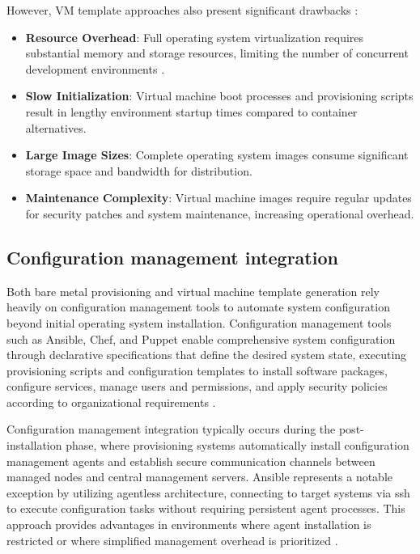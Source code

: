 However, VM template approaches also present significant drawbacks \citep{felterUpdatedPerformanceComparison2015}:
\begin{itemize}
    \item \textbf{Resource Overhead}: Full operating system virtualization requires substantial memory and storage resources, limiting the number of concurrent development environments \citep{kolyasnikovExperimentalEvaluationVirtual2019}.
    \item \textbf{Slow Initialization}: Virtual machine boot processes and provisioning scripts result in lengthy environment startup times compared to container alternatives.
    \item \textbf{Large Image Sizes}: Complete operating system images consume significant storage space and bandwidth for distribution.
    \item \textbf{Maintenance Complexity}: Virtual machine images require regular updates for security patches and system maintenance, increasing operational overhead.
\end{itemize}

\subsection{Configuration management integration}
Both bare metal provisioning and virtual machine template generation rely heavily on configuration management tools to automate system configuration beyond initial operating system installation.
Configuration management tools such as Ansible, Chef, and Puppet enable comprehensive system configuration through declarative specifications that define the desired system state, executing provisioning scripts and configuration templates to install software packages, configure services, manage users and permissions, and apply security policies according to organizational requirements \citep{nemethUNIXLinuxSystem2017}.

Configuration management integration typically occurs during the post-installation phase, where provisioning systems automatically install configuration management agents and establish secure communication channels between managed nodes and central management servers.
Ansible represents a notable exception by utilizing agentless architecture, connecting to target systems via \ac{ssh} to execute configuration tasks without requiring persistent agent processes.
This approach provides advantages in environments where agent installation is restricted or where simplified management overhead is prioritized \citep{nemethUNIXLinuxSystem2017}.

